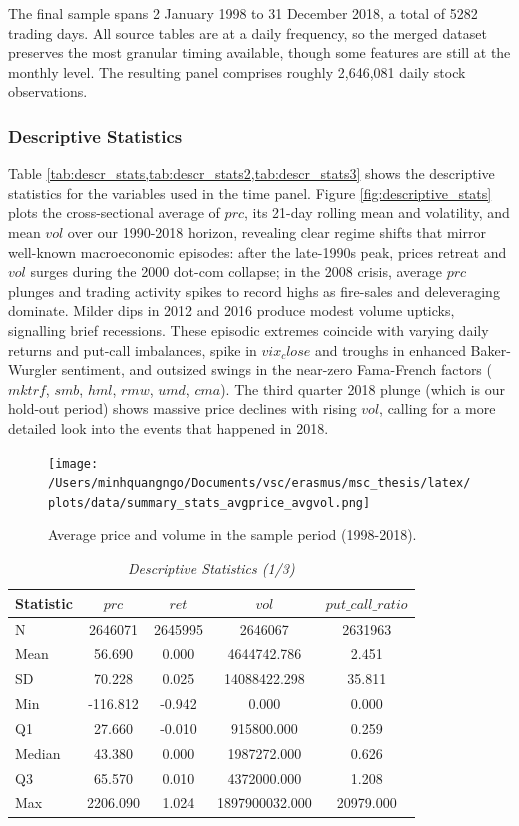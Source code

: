 The final sample spans 2 January 1998 to 31 December 2018, a total of 5282 trading days. All source tables are at a daily frequency, so the merged dataset preserves the most granular timing available, though some features are still at the monthly level. The resulting panel comprises roughly 2,646,081 daily stock observations. 

\subsubsection{Descriptive Statistics}
Table \cref{tab:descr_stats,tab:descr_stats2,tab:descr_stats3} shows the descriptive statistics for the variables used in the time panel. Figure \ref{fig:descriptive_stats} plots the cross-sectional average of $prc$, its 21-day rolling mean and volatility, and mean $vol$ over our 1990-2018 horizon, revealing clear regime shifts that mirror well-known macroeconomic episodes: after the late-1990s peak, prices retreat and $vol$ surges during the 2000 dot-com collapse; in the 2008 crisis, average $prc$ plunges and trading activity spikes to record highs as fire-sales and deleveraging dominate. Milder dips in 2012 and 2016 produce modest volume upticks, signalling brief recessions. These episodic extremes coincide with varying daily returns and put-call imbalances, spike in $vix_close$ and troughs in enhanced Baker-Wurgler sentiment, and outsized swings in the near-zero Fama-French factors ($mktrf$, $smb$, $hml$, $rmw$, $umd$, $cma$). The third quarter 2018 plunge (which is our hold-out period) shows massive price declines with rising $vol$, calling for a more detailed look into the events that happened in 2018. 


\begin{figure}[H]
    \centering
    \texttt{[image: /Users/minhquangngo/Documents/vsc/erasmus/msc\_thesis/latex/plots/data/summary\_stats\_avgprice\_avgvol.png]}
    \caption{Average price and volume in the sample period (1998-2018).}
    \label{fig:avgprice_avgvol}
\end{figure}

\begin{table}[H]
  \centering
  \caption{\textit{Descriptive Statistics (1/3)}}
  \label{tab:descr_stats}
  
  \begin{tabular}{lcccc}
  \toprule
  Statistic & $prc$ & $ret$ & $vol$ & $put\_call\_ratio$ \\\midrule
  N & 2646071 & 2645995 & 2646067 & 2631963 \\
  Mean & 56.690 & 0.000 & 4644742.786 & 2.451 \\
  SD & 70.228 & 0.025 & 14088422.298 & 35.811 \\
  Min & -116.812 & -0.942 & 0.000 & 0.000 \\
  Q1 & 27.660 & -0.010 & 915800.000 & 0.259 \\
  Median & 43.380 & 0.000 & 1987272.000 & 0.626 \\
  Q3 & 65.570 & 0.010 & 4372000.000 & 1.208 \\
  Max & 2206.090 & 1.024 & 1897900032.000 & 20979.000 \\
  \bottomrule
  \end{tabular}
  \end{table}
  
